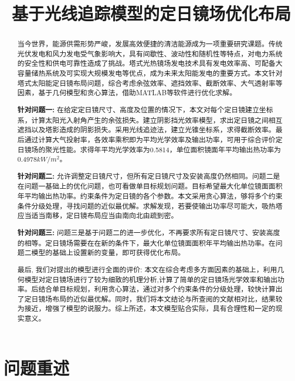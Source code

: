 \documentclass[withoutpreface,bwprint]{cumcmthesis}
\title{基于光线追踪模型的定日镜场优化布局}
\begin{document}
 \maketitle
 \begin{abstract}
 	当今世界，能源供需形势严峻，发展高效便捷的清洁能源成为一项重要研究课题。传统光伏发电和风力发电受气象影响大，具有间歇性、波动性和随机性等特点，对电力系统的安全性和供电可靠性造成了挑战。塔式光热镜场发电技术具有发电效率高、可配备大容量储热系统及可实现大规模发电等优点，成为未来太阳能发电的重要方式。本文针对塔式太阳能定日镜布局问题，综合考虑余弦效率、遮挡效率、截断效率、大气透射率等因素，基于几何模型和贪心算法，借助MATLAB等软件进行优化求解。
 	
 	\textbf{针对问题一:} 在给定定日镜尺寸、高度及位置的情况下，本文对每个定日镜建立坐标系，计算太阳光入射角产生的余弦损失。建立阴影挡光效率模型，求出定日镜之间相互遮挡以及塔影造成的阴影损失。采用光线追迹法，建立光锥坐标系，求得截断效率。最后通过计算大气投射率，各效率乘积即为平均光学效率及输出功率，可用于综合评价定日镜场的聚光性能。求得年平均光学效率为0.5814，单位面积镜面年平均输出热功率为0.4978$kW/m^2$。
 	
 	\textbf{针对问题二:} 允许调整定日镜尺寸，但所有定日镜尺寸及安装高度仍然相同。问题二是在问题一基础上的优化问题，也可看做单目标规划问题。目标希望最大化单位镜面面积年平均输出热功率。约束条件为定日镜的各个参数。本文采用贪心算法，够将多个约束条件分级处理，寻找问题的近似最优解。求解发现，若要使输出功率尽可能大，吸热塔应当适当南移，定日镜布局应当由南向北由疏到密。
 	
 	\textbf{针对问题三:} 问题三是基于问题二的进一步优化，不再要求所有定日镜尺寸、安装高度的相等。定日镜场需要在在新的条件下，最大化单位镜面面积年平均输出热功率。在问题二模型的基础上设置新的变量，即可获得优化布局。
 	
 	最后, 我们对提出的模型进行全面的评价: 本文在综合考虑多方面因素的基础上，利用几何模型对定日镜场进行了较为细致的机理分析,计算了简单的定日镜场光学效率和输出功率。后结合单目标规划，利用贪心算法，通过对多个约束条件的分级处理，较快计算出了定日镜场布局的近似最优解。同时，我们将本文结论与所查阅的文献相对比，结果较为接近，增强了模型的说服力。综上所述，本文模型贴合实际，具有合理性和一定的现实意义。
 	
	\end{abstract}	

\section{问题重述}
\end{document}
